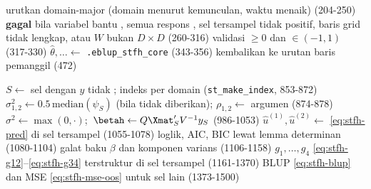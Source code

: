 \begin{algorithm}[htbp]
\caption{\texttt{eblup\_stfh} --- alur sebenarnya (\texttt{R/eblup\_stfh.R:164-480}, \texttt{src/eblup\_stfh\_core.cpp:826-1529})}
\label{alg:stfh}
urutkan domain-major (domain menurut kemunculan, waktu menaik) (204-250)\;
\textbf{gagal} bila variabel bantu , semua respons ,  sel tersampel tidak positif, baris grid tidak lengkap, atau $W$ bukan $D\times D$ (260-316)\;
validasi  $\ge0$ dan  $\in(-1,1)$ (317-330)\;
$\hat\theta,\ldots\leftarrow$ \texttt{.eblup\_stfh\_core} (343-356)\;
\;
kembalikan ke urutan baris pemanggil (472)\;
\caption*{}
$S\leftarrow$ sel dengan $y$ tidak ; indeks per domain (\texttt{st\_make\_index}, 853-872)\;
$\sigma_{1,2}^{2}\leftarrow0.5\,\mathrm{median}(\psi_S)$ (bila tidak diberikan);\quad
  $\rho_{1,2}\leftarrow$ argumen (874-878)\;
$\sigma^2\leftarrow\max(0,\cdot)$;\ $\betah\leftarrow Q\Xmat_S'V^{-1}y_S$ (986-1053)\;
$\hat u^{(1)},\hat u^{(2)}\leftarrow$ \eqref{eq:stfh-pred} di sel tersampel (1055-1078)\;
loglik, AIC, BIC lewat lemma determinan (1080-1104)\;
galat baku $\beta$ dan komponen varians (1106-1158)\;
$g_1,\dots,g_4$ \eqref{eq:stfh-g12}--\eqref{eq:stfh-g34} terstruktur di sel tersampel (1161-1370)\;
BLUP \eqref{eq:stfh-blup} dan MSE \eqref{eq:stfh-mse-oos} untuk sel lain (1373-1500)\;
\end{algorithm}

